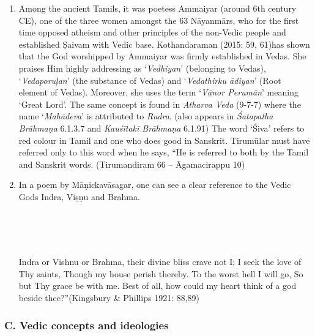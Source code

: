 \begin{enumerate}[{\rm 1.}]
\itemsep=0pt
\item Among the ancient Tamils, it was poetess Ammaiyar (around 6th century CE), one of the three women amongst the 63 Nāyanmārs, who for the first time opposed atheism and other principles of the non-Vedic people and established Ṣaivam with Vedic base. Kothandaraman (2015: 59, 61)has shown that the God worshipped by Ammaiyar was firmly established in Vedas. She praises Him highly addressing as ‘\textit{Vedhiyan}’ (belonging to Vedas), ‘\textit{Vedaporuḷan}’ (the substance of Vedas) and ‘\textit{Vedathirku ādiyan}’ (Root element of Vedas). Moreover, she uses the term ‘\textit{Vānor Perumān}’ meaning ‘Great Lord’. The same concept is found in \textit{Atharva Veda} (9-7-7) where the name ‘\textit{Mahādeva}’ is attributed to \textit{Rudra}. (also appears in \textit{Śatapatha Brāhmaṇa} 6.1.3.7 and \textit{Kauśītakī Brāhmaṇa} 6.1.91) The word ‘Śiva’ refers to red colour in Tamil and one who does good in Sanskrit. Tirumūlar must have referred only to this word when he says, “He is referred to both by the Tamil and Sanskrit words. (Tirumandiram 66 – Āgamacirappu 10)

 \item 
 In a poem by Māṇickavāsagar, one can see a clear reference to the Vedic Gods Indra, Viṣṇu and Brahma.

\begin{myquote}
\\\\\\
\end{myquote}

\begin{myquote}
Indra or Vishnu or Brahma, their divine bliss crave not I; I seek the love of Thy saints, Though my house perish thereby. To the worst hell I will go, So but Thy grace be with me. Best of all, how could my heart think of a god beside thee?”\hfill (Kingsbury \& Phillips 1921: 88,89)
\end{myquote}


\end{enumerate}


\subsubsection*{C. Vedic concepts and ideologies}

